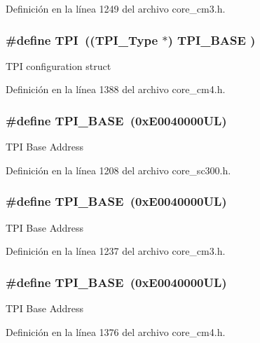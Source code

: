 Definición en la línea 1249 del archivo core\+\_\+cm3.\+h.

\subsubsection[{\texorpdfstring{T\+PI}{TPI}}]{\setlength{\rightskip}{0pt plus 5cm}\#define T\+PI~(({\bf T\+P\+I\+\_\+\+Type}       $\ast$)     {\bf T\+P\+I\+\_\+\+B\+A\+SE}      )}\hypertarget{group___c_m_s_i_s__core__base_ga8b4dd00016aed25a0ea54e9a9acd1239}{}\label{group___c_m_s_i_s__core__base_ga8b4dd00016aed25a0ea54e9a9acd1239}
T\+PI configuration struct 

Definición en la línea 1388 del archivo core\+\_\+cm4.\+h.

\subsubsection[{\texorpdfstring{T\+P\+I\+\_\+\+B\+A\+SE}{TPI_BASE}}]{\setlength{\rightskip}{0pt plus 5cm}\#define T\+P\+I\+\_\+\+B\+A\+SE~(0x\+E0040000\+U\+L)}\hypertarget{group___c_m_s_i_s__core__base_ga2b1eeff850a7e418844ca847145a1a68}{}\label{group___c_m_s_i_s__core__base_ga2b1eeff850a7e418844ca847145a1a68}
T\+PI Base Address 

Definición en la línea 1208 del archivo core\+\_\+sc300.\+h.

\subsubsection[{\texorpdfstring{T\+P\+I\+\_\+\+B\+A\+SE}{TPI_BASE}}]{\setlength{\rightskip}{0pt plus 5cm}\#define T\+P\+I\+\_\+\+B\+A\+SE~(0x\+E0040000\+U\+L)}\hypertarget{group___c_m_s_i_s__core__base_ga2b1eeff850a7e418844ca847145a1a68}{}\label{group___c_m_s_i_s__core__base_ga2b1eeff850a7e418844ca847145a1a68}
T\+PI Base Address 

Definición en la línea 1237 del archivo core\+\_\+cm3.\+h.

\subsubsection[{\texorpdfstring{T\+P\+I\+\_\+\+B\+A\+SE}{TPI_BASE}}]{\setlength{\rightskip}{0pt plus 5cm}\#define T\+P\+I\+\_\+\+B\+A\+SE~(0x\+E0040000\+U\+L)}\hypertarget{group___c_m_s_i_s__core__base_ga2b1eeff850a7e418844ca847145a1a68}{}\label{group___c_m_s_i_s__core__base_ga2b1eeff850a7e418844ca847145a1a68}
T\+PI Base Address 

Definición en la línea 1376 del archivo core\+\_\+cm4.\+h.

